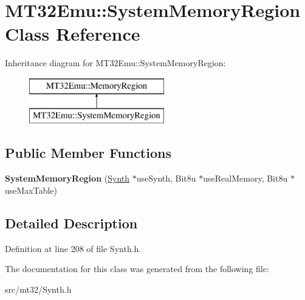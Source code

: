 \hypertarget{classMT32Emu_1_1SystemMemoryRegion}{\section{M\-T32\-Emu\-:\-:System\-Memory\-Region Class Reference}
\label{classMT32Emu_1_1SystemMemoryRegion}
}
Inheritance diagram for M\-T32\-Emu\-:\-:System\-Memory\-Region\-:\begin{figure}[H]
\begin{center}
\leavevmode
\includegraphics[height=2.000000cm]{classMT32Emu_1_1SystemMemoryRegion}
\end{center}
\end{figure}
\subsection*{Public Member Functions}
\begin{DoxyCompactItemize}
\item 
\hypertarget{classMT32Emu_1_1SystemMemoryRegion_a3cc18e1a5a6617a14222ae165bbfa826}{{\bfseries System\-Memory\-Region} (\hyperlink{classMT32Emu_1_1Synth}{Synth} $\ast$use\-Synth, Bit8u $\ast$use\-Real\-Memory, Bit8u $\ast$use\-Max\-Table)}\label{classMT32Emu_1_1SystemMemoryRegion_a3cc18e1a5a6617a14222ae165bbfa826}

\end{DoxyCompactItemize}


\subsection{Detailed Description}


Definition at line 208 of file Synth.\-h.



The documentation for this class was generated from the following file\-:\begin{DoxyCompactItemize}
\item 
src/mt32/Synth.\-h\end{DoxyCompactItemize}
